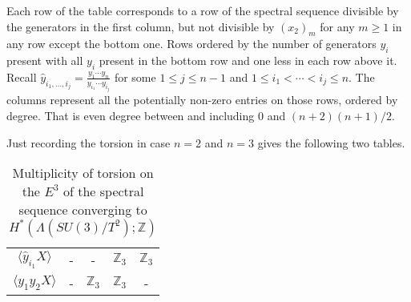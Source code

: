 \documentclass{article}
\theoremstyle{plain}
\theoremstyle{definition}
\numberwithin{thm}{section}
\begin{document}
			
			\begin{table}[ht]
			\centering
			\caption{Part of the $E^3$-page of the spectral sequence converging to $H^*(\Lambda(SU(5)/T^4);\mathbb{Z})$}
			\end{table}
			
			
			Each row of the table corresponds to a row of the spectral sequence divisible by the generators in the first column,
			but not divisible by $(x_2)_m$ for any $m\geq 1$ in any row except the bottom one.
			Rows ordered by the number of generators $y_i$ present with all $y_i$ present in the bottom row and one less in each row above it.
			Recall $\hat{y}_{i_1,\dots,i_j}=\frac{y_1\cdots y_n}{y_{i_1}\cdots y_{i_j}}$ for some $1\leq j \leq n-1$ and $1\leq i_1<\cdots<i_j\leq n$.
			The columns represent all the potentially non-zero entries on those rows, ordered by degree.
			That is even degree between and including $0$ and $(n+2)(n+1)/2$.
			
			Just recording the torsion in case $n=2$ and $n=3$ gives the following two tables.
			
			\begin{table}[ht]
			\centering
			\caption{Multiplicity of torsion on the $E^3$ of the spectral sequence converging to $H^*(\Lambda(SU(3)/T^2);\mathbb{Z})$}
			\label{n=2}
			\begin{tabular}{c|cccc}
			$\langle \hat{y}_{i_1}X \rangle$ 	&			-				& 			-			 	 & $\mathbb{Z}_3$ & $\mathbb{Z}_3$ \\
			$\langle y_1y_2X \rangle$ 				&			-				& $\mathbb{Z}_3$ & $\mathbb{Z}_3$ &    -
			\end{tabular}
			\end{table}
			
\end{document}
